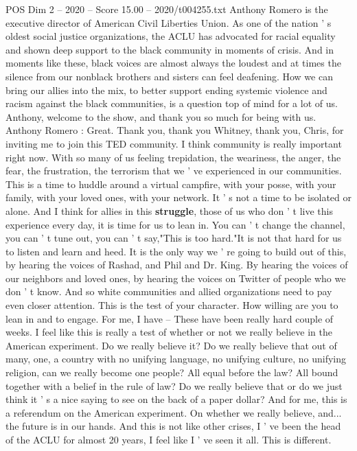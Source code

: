 \begin{textsample}{POS Dim 2 – 2020 – Score 15.00 – 2020/t004255.txt}
Anthony Romero is the executive director of American Civil Liberties Union.
As one of the nation ' s oldest social justice organizations, the ACLU has advocated for racial equality and shown deep support to the black community in moments of crisis.
And in moments like these, black voices are almost always the loudest and at times the silence from our nonblack brothers and sisters can feel deafening.
How we can bring our allies into the mix, to better support ending systemic violence and racism against the black communities, is a question top of mind for a lot of us.
Anthony, welcome to the show, and thank you so much for being with us.
Anthony Romero : Great.
Thank you, thank you Whitney, thank you, Chris, for inviting me to join this TED community.
I think community is really important right now.
With so many of us feeling trepidation, the weariness, the anger, the fear, the frustration, the terrorism that we ' ve experienced in our communities.
This is a time to huddle around a virtual campfire, with your posse, with your family, with your loved ones, with your network.
It ' s not a time to be isolated or alone.
And I think for allies in this \textbf{struggle}, those of us who don ' t live this experience every day, it is time for us to lean in.
You can ' t change the channel, you can ' t tune out, you can ' t say,"This is too hard."It is not that hard for us to listen and learn and heed.
It is the only way we ' re going to build out of this, by hearing the voices of Rashad, and Phil and Dr.
King.
By hearing the voices of our neighbors and loved ones, by hearing the voices on Twitter of people who we don ' t know.
And so white communities and allied organizations need to pay even closer attention.
This is the test of your character.
How willing are you to lean in and to engage.
For me, I have -- These have been really hard couple of weeks.
I feel like this is really a test of whether or not we really believe in the American experiment.
Do we really believe it?
Do we really believe that out of many, one, a country with no unifying language, no unifying culture, no unifying religion, can we really become one people?
All equal before the law?
All bound together with a belief in the rule of law?
Do we really believe that or do we just think it ' s a nice saying to see on the back of a paper dollar?
And for me, this is a referendum on the American experiment.
On whether we really believe, and... the future is in our hands.
And this is not like other crises, I ' ve been the head of the ACLU for almost 20 years, I feel like I ' ve seen it all.
This is different.

\end{textsample}
